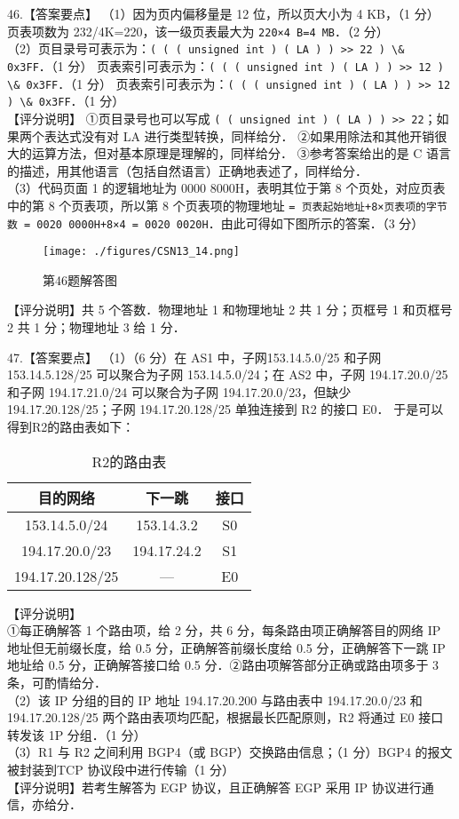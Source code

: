 46.【答案要点】
（1）因为页内偏移量是 12 位，所以页大小为 4 KB，（1 分） 页表项数为 232/4K=220，该一级页表最大为 \verb|220×4 B=4 MB|．（2 分）  \\
（2）页目录号可表示为：\verb|( ( ( unsigned int ) ( LA ) ) >> 22 ) \& 0x3FF|．（1 分）        页表索引可表示为：\verb|( ( ( unsigned int ) ( LA ) ) >> 12 ) \& 0x3FF|．（1 分）        页表索引可表示为：\verb|( ( ( unsigned int ) ( LA ) ) >> 12 ) \& 0x3FF|．（1 分） \\
【评分说明】 
①页目录号也可以写成 \verb|( ( unsigned int ) ( LA ) ) >> 22|；如果两个表达式没有对 LA 进行类型转换，同样给分． 
②如果用除法和其他开销很大的运算方法，但对基本原理是理解的，同样给分． 
③参考答案给出的是 C 语言的描述，用其他语言（包括自然语言）正确地表述了，同样给分．  \\
（3）代码页面 1 的逻辑地址为 0000 8000H，表明其位于第 8 个页处，对应页表中的第 8 个页表项，所以第 8 个页表项的物理地址 \verb|= 页表起始地址+8×页表项的字节数 = 0020 0000H+8×4 = 0020 0020H|．由此可得如下图所示的答案．（3 分）
\begin{figure}[ht]
\centering
\texttt{[image: ./figures/CSN13\_14.png]}
\caption{第46题解答图} \label{CSN13_fig14}
\end{figure}
【评分说明】共 5 个答数．物理地址 1 和物理地址 2 共 1 分；页框号 1 和页框号 2 共 1 分；物理地址 3 给 1 分．

47.【答案要点】 
  （1）（6 分）在 AS1 中，子网153.14.5.0/25 和子网 153.14.5.128/25 可以聚合为子网
153.14.5.0/24；在 AS2 中，子网 194.17.20.0/25 和子网 194.17.21.0/24 可以聚合为子网 194.17.20.0/23，但缺少 194.17.20.128/25；子网 194.17.20.128/25 单独连接到 R2 的接口 E0． 
于是可以得到R2的路由表如下：
\begin{table}[ht]
\centering
\caption{R2的路由表}\label{CSN13_tab9}
\begin{tabular}{|c|c|c|}
\hline
目的网络 & 下一跳 & 接口  \\
\hline
153.14.5.0/24 & 153.14.3.2 & S0  \\
\hline
194.17.20.0/23 & 194.17.24.2 & S1  \\
\hline
194.17.20.128/25 & — & E0  \\
\hline
\end{tabular}
\end{table}
【评分说明】 \\
①每正确解答 1 个路由项，给 2 分，共 6 分，每条路由项正确解答目的网络 IP 地址但无前缀长度，给 0.5 分，正确解答前缀长度给 0.5 分，正确解答下一跳 IP 地址给 0.5 分，正确解答接口给 0.5 分．②路由项解答部分正确或路由项多于 3 条，可酌情给分． \\
（2）该 IP 分组的目的 IP 地址 194.17.20.200 与路由表中 194.17.20.0/23 和 194.17.20.128/25 两个路由表项均匹配，根据最长匹配原则，R2 将通过 E0 接口转发该 1P 分组．（1 分） \\
（3）R1 与 R2 之间利用 BGP4（或 BGP）交换路由信息；（1 分）BGP4 的报文被封装到TCP 协议段中进行传输（1 分） \\
【评分说明】若考生解答为 EGP 协议，且正确解答 EGP 采用 IP 协议进行通信，亦给分． 